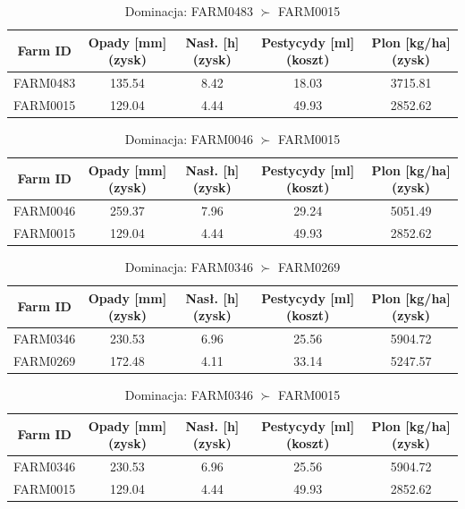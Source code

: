 \documentclass[11pt]{article}
\begin{document}
\begin{table}[H]
\centering
\begin{tabular}{|c||c|c|c|c|}
\hline
\textbf{Farm ID} & \textbf{Opady [mm] (zysk)} & \textbf{Nasł. [h] (zysk)} & \textbf{Pestycydy [ml] (koszt)} & \textbf{Plon [kg/ha] (zysk)} \\
\hline
FARM0483 & 135.54 & 8.42 & 18.03 & 3715.81 \\ \hline
FARM0015 & 129.04 & 4.44 & 49.93 & 2852.62 \\
\hline
\end{tabular}
\caption{Dominacja: FARM0483 $\succ$ FARM0015}
\end{table}

\begin{table}[H]
\centering
\begin{tabular}{|c||c|c|c|c|}
\hline
\textbf{Farm ID} & \textbf{Opady [mm] (zysk)} & \textbf{Nasł. [h] (zysk)} & \textbf{Pestycydy [ml] (koszt)} & \textbf{Plon [kg/ha] (zysk)} \\
\hline
FARM0046 & 259.37 & 7.96 & 29.24 & 5051.49 \\ \hline
FARM0015 & 129.04 & 4.44 & 49.93 & 2852.62 \\
\hline
\end{tabular}
\caption{Dominacja: FARM0046 $\succ$ FARM0015}
\end{table}

\begin{table}[H]
\centering
\begin{tabular}{|c||c|c|c|c|}
\hline
\textbf{Farm ID} & \textbf{Opady [mm] (zysk)} & \textbf{Nasł. [h] (zysk)} & \textbf{Pestycydy [ml] (koszt)} & \textbf{Plon [kg/ha] (zysk)} \\
\hline
FARM0346 & 230.53 & 6.96 & 25.56 & 5904.72 \\ \hline
FARM0269 & 172.48 & 4.11 & 33.14 & 5247.57 \\
\hline
\end{tabular}
\caption{Dominacja: FARM0346 $\succ$ FARM0269}
\end{table}

\begin{table}[H]
\centering
\begin{tabular}{|c||c|c|c|c|}
\hline
\textbf{Farm ID} & \textbf{Opady [mm] (zysk)} & \textbf{Nasł. [h] (zysk)} & \textbf{Pestycydy [ml] (koszt)} & \textbf{Plon [kg/ha] (zysk)} \\
\hline 
FARM0346 & 230.53 & 6.96 & 25.56 & 5904.72 \\ \hline
FARM0015 & 129.04 & 4.44 & 49.93 & 2852.62 \\
\hline
\end{tabular}
\caption{Dominacja: FARM0346 $\succ$ FARM0015}
\end{table}
\end{document}
